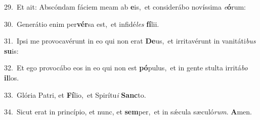 {\numbfont\textcolor{\numbcolor}{29.}}~Et ait: Abscóndam fáciem meam ab \textbf{e}\-is,~\star et considerábo novíssima \textit{e}\-\textbf{ó}rum:\par
{\numbfont\textcolor{\numbcolor}{30.}}~Generátio enim per\-\textbf{vér}\-sa est,~\star et infidé\textit{les} \textbf{fí}\-lii.\par
{\numbfont\textcolor{\numbcolor}{31.}}~Ipsi me provocavérunt in eo qui non erat \textbf{De}\-us,~\star et irritavérunt in vanitáti\textit{bus} \textbf{su}\-is:\par
{\numbfont\textcolor{\numbcolor}{32.}}~Et ego provocábo eos in eo qui non est \textbf{pó}\-pulus,~\star et in gente stulta irritá\textit{bo} \textbf{il}\-los.\par
{\numbfont\textcolor{\numbcolor}{33.}}~Glória Patri, et \textbf{Fí}\-lio,~\star et Spirítu\textit{i} \textbf{Sanc}\-to.\par
{\numbfont\textcolor{\numbcolor}{34.}}~Sicut erat in princípio, et nunc, et \textbf{sem}\-per,~\star et in sǽcula sæculó\-\textit{rum}\-. \textbf{A}\-men.\par
